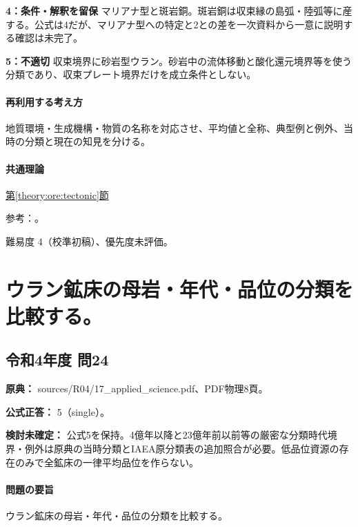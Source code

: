 \noindent\textbf{4：条件・解釈を留保} マリアナ型と斑岩銅。斑岩銅は収束縁の島弧・陸弧等に産する。公式は4だが、マリアナ型への特定と2との差を一次資料から一意に説明する確認は未完了。\par

\noindent\textbf{5：不適切} 収束境界に砂岩型ウラン。砂岩中の流体移動と酸化還元境界等を使う分類であり、収束プレート境界だけを成立条件としない。\par

\paragraph{再利用する考え方} 地質環境・生成機構・物質の名称を対応させ、平均値と全称、典型例と例外、当時の分類と現在の知見を分ける。

\paragraph{共通理論} \hyperref[theory:ore:tectonic]{第\ref*{theory:ore:tectonic}節}

\par 参考：\cite{ore50_porphyry_ref,ore50_backarc_ref,usgs_plate_boundaries}。

\par 難易度 4（校準初稿）、優先度未評価。

\section{ウラン鉱床の母岩・年代・品位の分類を比較する。}

\subsection{令和4年度 問24}
\label{q:r04-reg-applied-24}

\noindent\textbf{原典：} sources/R04/17\_applied\_science.pdf、PDF物理8頁。

\textbf{公式正答：} 5（single）。

\par\textbf{検討未確定：} 公式5を保持。4億年以降と23億年前以前等の厳密な分類時代境界・例外は原典の当時分類とIAEA原分類表の追加照合が必要。低品位資源の存在のみで全鉱床の一律平均品位を作らない。

\paragraph{問題の要旨} ウラン鉱床の母岩・年代・品位の分類を比較する。

